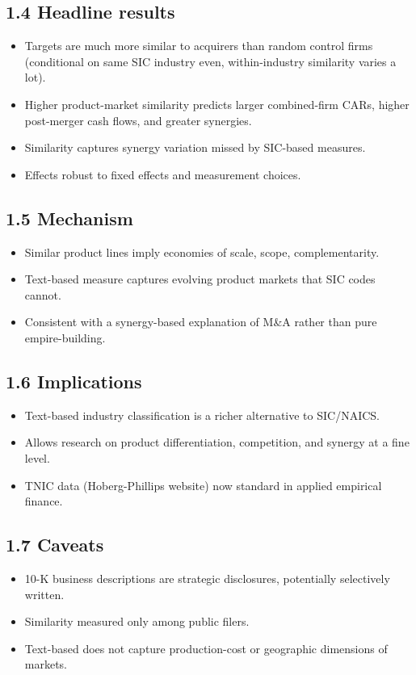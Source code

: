 \documentclass[11pt]{article}
\begin{document}
\subsection*{1.4 Headline results}
\begin{itemize}
\item Targets are much more similar to acquirers than random control firms (conditional on same SIC industry even, within-industry similarity varies a lot).
\item Higher product-market similarity predicts larger combined-firm CARs, higher post-merger cash flows, and greater synergies.
\item Similarity captures synergy variation missed by SIC-based measures.
\item Effects robust to fixed effects and measurement choices.
\end{itemize}

\subsection*{1.5 Mechanism}
\begin{itemize}
\item Similar product lines imply economies of scale, scope, complementarity.
\item Text-based measure captures evolving product markets that SIC codes cannot.
\item Consistent with a synergy-based explanation of M\&A rather than pure empire-building.
\end{itemize}

\subsection*{1.6 Implications}
\begin{itemize}
\item Text-based industry classification is a richer alternative to SIC/NAICS.
\item Allows research on product differentiation, competition, and synergy at a fine level.
\item TNIC data (Hoberg-Phillips website) now standard in applied empirical finance.
\end{itemize}

\subsection*{1.7 Caveats}
\begin{alertbox}
\begin{itemize}
\item 10-K business descriptions are strategic disclosures, potentially selectively written.
\item Similarity measured only among public filers.
\item Text-based does not capture production-cost or geographic dimensions of markets.
\end{itemize}
\end{alertbox}
\end{document}
